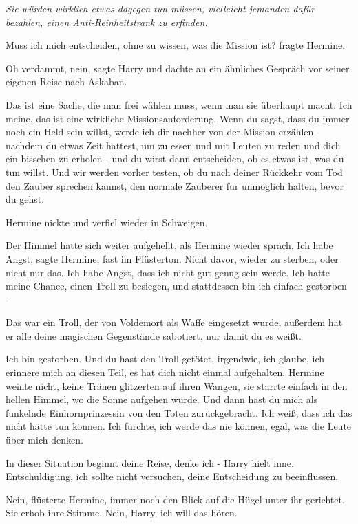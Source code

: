 \emph{Sie würden wirklich etwas dagegen tun müssen, vielleicht jemanden dafür
bezahlen, einen Anti-Reinheitstrank zu erfinden.}

\glqq{}Muss ich mich entscheiden, ohne zu wissen, was die Mission ist?\grqq{}
fragte Hermine.

\glqq{}Oh verdammt, nein\grqq{}, sagte Harry und dachte an ein ähnliches Gespräch
vor seiner eigenen Reise nach Askaban.

\glqq{}Das ist eine Sache, die man frei wählen muss, wenn man sie überhaupt
macht. Ich meine, das ist eine wirkliche Missionsanforderung. Wenn du sagst,
dass du immer noch ein Held sein willst, werde ich dir nachher von der Mission
erzählen - nachdem du etwas Zeit hattest, um zu essen und mit Leuten zu reden
und dich ein bisschen zu erholen - und du wirst dann entscheiden, ob es etwas
ist, was du tun willst. Und wir werden vorher testen, ob du nach deiner Rückkehr
vom Tod den Zauber sprechen kannst, den normale Zauberer für unmöglich halten,
bevor du gehst.\grqq{}

Hermine nickte und verfiel wieder in Schweigen.

Der Himmel hatte sich weiter aufgehellt, als Hermine wieder sprach. \glqq{}Ich
habe Angst\grqq{}, sagte Hermine, fast im Flüsterton. \glqq{}Nicht davor, wieder
zu sterben, oder nicht nur das. Ich habe Angst, dass ich nicht gut genug sein
werde. Ich hatte meine Chance, einen Troll zu besiegen, und stattdessen bin ich
einfach gestorben -\grqq{}

\glqq{}Das war ein Troll, der von Voldemort als Waffe eingesetzt wurde, außerdem
hat er alle deine magischen Gegenstände sabotiert, nur damit du es weißt.\grqq{}

\glqq{}Ich bin gestorben. Und du hast den Troll getötet, irgendwie, ich glaube,
ich erinnere mich an diesen Teil, es hat dich nicht einmal aufgehalten.\grqq{}
Hermine weinte nicht, keine Tränen glitzerten auf ihren Wangen, sie starrte
einfach in den hellen Himmel, wo die Sonne aufgehen würde. \glqq{}Und dann hast
du mich als funkelnde Einhornprinzessin von den Toten zurückgebracht. Ich weiß,
dass ich das nicht hätte tun können. Ich fürchte, ich werde das nie können,
egal, was die Leute über mich denken.\grqq{}

\glqq{}In dieser Situation beginnt deine Reise, denke ich -\grqq{} Harry hielt
inne. \glqq{}Entschuldigung, ich sollte nicht versuchen, deine Entscheidung zu
beeinflussen.\grqq{}

\glqq{}Nein\grqq{}, flüsterte Hermine, immer noch den Blick auf die Hügel unter
ihr gerichtet. Sie erhob ihre Stimme. \glqq{}Nein, Harry, ich will das
hören.\grqq{}

